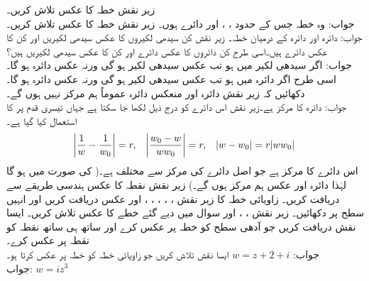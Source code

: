 \quad
زیر نقش  خطہ  کا عکس تلاش کریں۔\\
جواب:\quad
وہ خطہ جس کے حدود ، ،  اور  دائرے ہوں۔
\quad
زیر نقش  خطہ  کا عکس تلاش کریں۔\\
جواب:\quad
دائرہ  اور دائرہ  کے درمیان خطہ۔
\quad
زیر نقش  کن سیدھی لکیروں کا عکس سیدھی لکیریں اور کن کا عکس دائرے ہیں۔اسی طرح کن دائروں کا عکس دائرے اور  کن کا عکس سیدھی لکیریں ہیں؟\\
جواب:\quad
اگر سیدھی لکیر  میں  ہو تب عکس سیدھی لکیر ہو گی ورنہ عکس دائرہ ہو گا۔اسی طرح اگر دائرہ  میں  ہو تب عکس سیدھی لکیر ہو گی ورنہ عکس دائرہ ہو گا۔
\quad
دکھائیں کہ زیر نقش   دائرہ اور منعکس دائرہ عموماً  ہم مرکز نہیں ہوں گے۔\\
جواب:\quad
دائرہ  کا مرکز  ہے۔زیر نقش  اس دائرے کو درج ذیل لکھا جا سکتا ہے جہاں تیسری قدم پر
  کا استعمال کیا گیا ہے۔
\begin{align*}
\abs{\frac{1}{w}-\frac{1}{w_0}}=r,\quad \abs{\frac{w_0-w}{ww_0}}=r,\quad \abs{w-w_0}=r\abs{ww_0}
\end{align*} 
اس دائرے کا مرکز  ہے جو اصل دائرے کی مرکز  سے مختلف ہے۔( کی صورت میں  ہو گا لہٰذا دائرہ اور عکس ہم مرکز ہوں گے۔)
\quad
زیر نقش  نقطہ  کا عکس  ہندسی طریقے سے دریافت کریں۔
\quad
زاویائی  خطہ  کا زیر نقش  ، ، ، ، ،   اور  عکس دریافت کریں اور انہیں  سطح پر دکھائیں۔
\quad
زیر نقش ، ،  اور  سوال  میں دیے گئے خطے کا عکس تلاش کریں۔
\quad
ایسا نقش  دریافت کریں جو آدھی سطح  کو خطہ  پر عکس کرے اور ساتھ ہی ساتھ نقطہ  کو نقطہ  پر عکس کرے۔\\
جواب:\quad
$w=z+2+i$
\quad
ایسا نقش  تلاش کریں جو زاویائی خطہ  کو خطہ  پر عکس کرتا ہو۔\\
جواب:\quad
$w=iz^3$

